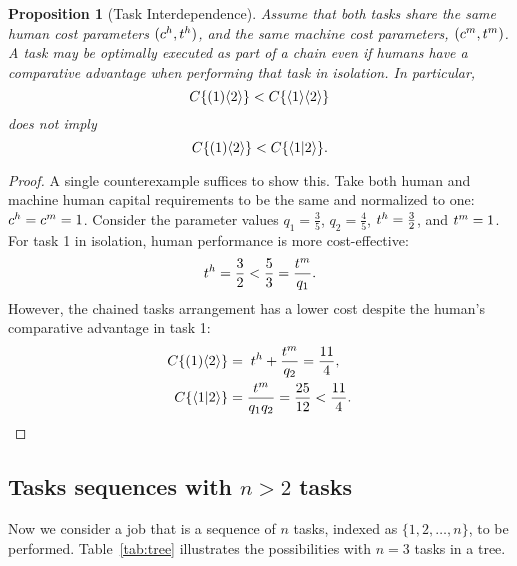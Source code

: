 \documentclass{article}
\theoremstyle{plain}
\theoremstyle{plain}
\newtheorem{proposition}[theorem]{Proposition}
\begin{document}
\begin{proposition}[Task Interdependence] \label{proposition:interdependence}
Assume that both tasks share the same human cost parameters $(c^{h}_{}, t^{h}_{})$, and the same machine cost parameters, $(c^{m}_{}, t^{m}_{})$.
A task may be optimally executed as part of a chain even if humans have a comparative advantage when performing that task in isolation.
In particular,
\[
C\{ ( 1 )\langle 2 \rangle \} < C\{ \langle 1 \rangle\langle 2 \rangle \}
\]
does not imply
\[
C\{ ( 1 )\langle 2 \rangle \} < C\{ \langle 1|2 \rangle \}.
\]
\end{proposition}
\begin{proof}
A single counterexample suffices to show this.
Take both human and machine human capital requirements to be the same and normalized to one: \(c^{h}_{} = c^{m}_{} = 1\).
Consider the parameter values $q_1 = \frac{3}{5}$, $q_2 = \frac{4}{5}$, $t^{h}_{} = \frac{3}{2}$, and $t^{m}_{} = 1$.
For task 1 in isolation, human performance is more cost-effective:
\[
t^{h}_{} = \frac{3}{2} < \frac{5}{3} = \frac{t^{m}_{}}{q_1}.
\]
However, the chained tasks arrangement has a lower cost despite the human's comparative advantage in task 1:
\begin{align*}
    C\{ ( 1 )\langle 2 \rangle \} &= \; t^{h}_{} + \frac{t^{m}_{}}{q_2} = \frac{11}{4}, \\
    C\{ \langle 1|2 \rangle \} &= \frac{t^{m}_{}}{q_1 q_2} = \frac{25}{12} < \frac{11}{4}.
\end{align*}
\end{proof}


\subsection{Tasks sequences with \(n > 2\) tasks}
Now we consider a job that is a sequence of \(n\) tasks, indexed as \(\{1, 2, \ldots, n\}\), to be performed.
Table~\ref{tab:tree} illustrates the possibilities with \(n=3\) tasks in a tree.
\end{document}

